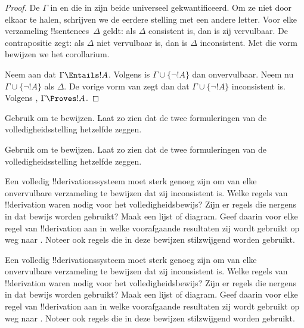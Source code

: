 \documentclass[../../../include/open-logic-section]{subfiles}
\begin{document}
\begin{proof}
De $\Gamma$ in  en die in
 zijn beide universeel gekwantificeerd. Om ze
niet door elkaar te halen, schrijven we de eerdere stelling met een
andere letter. Voor elke verzameling !!{sentence}s~$\Delta$ geldt: als
$\Delta$ consistent is, dan is zij vervulbaar. De contrapositie zegt:
als $\Delta$ niet vervulbaar is, dan is $\Delta$ inconsistent. Met die vorm
bewijzen we het corollarium.

Neem aan dat $\Gamma \Entails !A$. Volgens
 is $\Gamma \cup \{\lnot !A\}$ dan
onvervulbaar. Neem nu $\Gamma \cup \{\lnot !A\}$ als $\Delta$. De vorige
vorm van  zegt dan dat
$\Gamma \cup \{\lnot !A\}$ inconsistent is. Volgens
,
$\Gamma \Proves !A$.
\end{proof}

\begin{prob}
Gebruik  om
 te bewijzen. Laat zo zien dat de
twee formuleringen van de volledigheidsstelling hetzelfde zeggen.
\end{prob}
\tagendprob

\begin{prob}
Gebruik  om
 te bewijzen. Laat zo zien dat de
twee formuleringen van de volledigheidsstelling hetzelfde zeggen.
\end{prob}
\tagendprob

\begin{prob}
Een volledig !!{derivation}ssysteem moet sterk genoeg zijn om van elke
onvervulbare verzameling te bewijzen dat zij inconsistent is. Welke
regels van !!{derivation} waren nodig voor het volledigheidsbewijs? Zijn
er regels die nergens in dat bewijs worden gebruikt? Maak een lijst of
diagram. Geef daarin voor elke regel van !!{derivation} aan in welke
voorafgaande resultaten zij wordt gebruikt op weg naar
. Noteer ook regels die in deze
bewijzen stilzwijgend worden gebruikt.
\end{prob}
\tagendprob

\begin{prob}
Een volledig !!{derivation}ssysteem moet sterk genoeg zijn om van elke
onvervulbare verzameling te bewijzen dat zij inconsistent is. Welke
regels van !!{derivation} waren nodig voor het volledigheidsbewijs? Zijn
er regels die nergens in dat bewijs worden gebruikt? Maak een lijst of
diagram. Geef daarin voor elke regel van !!{derivation} aan in welke
voorafgaande resultaten zij wordt gebruikt op weg naar
. Noteer ook regels die in deze
bewijzen stilzwijgend worden gebruikt.
\end{prob}
\tagendprob
\end{document}
